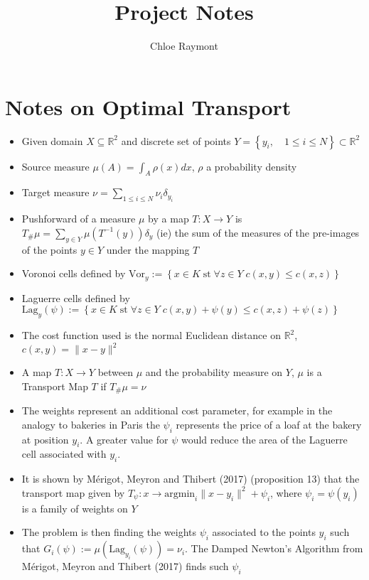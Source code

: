 \documentclass[]{article}
\title{Project Notes}
\author{Chloe Raymont}
\begin{document}
\maketitle

\begin{abstract}

\end{abstract}

\section{Notes on Optimal Transport}
	\begin{itemize}
		\item Given domain $X \subseteq \mathbb{R}^2$ and discrete set of points $Y = \left\lbrace y_i, \quad 1\leq i \leq N \right\rbrace  \subset \mathbb{R}^2$ 
		\item Source measure $\mu(A) = \int_A \rho(x)dx$, $\rho$ a probability density
		\item Target measure $\nu = \sum_{1\leq i \leq N}\nu_i \delta_{y_i}$ 
		\item Pushforward of a measure $\mu$ by a map $T: X \rightarrow Y$ is $T_{\#}\mu = \sum_{y \in Y} \mu \left( T^{-1}(y) \right) \delta_{y}$ (ie) the sum of the measures of the pre-images of the points $y \in Y$ under the mapping $T$
		\item Voronoi cells defined by $\text{Vor}_y := \left\lbrace x \in K \; \text{st} \; \forall z \in Y \; c(x,y) \leq c(x,z) \right\rbrace$
		\item Laguerre cells defined by $\text{Lag}_y(\psi) := \left\lbrace x \in K \; \text{st} \; \forall z \in Y \; c(x,y) + \psi(y) \leq c(x,z) + \psi(z) \right\rbrace$
		\item The cost function used is the normal Euclidean distance on $\mathbb{R}^2$, $c(x,y) = \| x-y\|^2$
		\item A map $T: X \rightarrow Y$ between $\mu$ and the probability measure on $Y$, $\mu$ is a Transport Map $T$ if $T_{\#}\mu = \nu$
		\item The weights represent an additional cost parameter, for example in the analogy to bakeries in Paris the $\psi_i$ represents the price of a loaf at the bakery at position $y_i$. A greater value for $\psi$ would reduce the area of the Laguerre cell associated with $y_i$.
		\item It is shown by M\'{e}rigot, Meyron and Thibert (2017) (proposition 13) that the transport map given by $T_\psi: x \rightarrow \text{argmin}_i\| x - y_i \|^2 + \psi_i$, where $\psi_i = \psi(y_i)$ is a family of weights on $Y$
		
		\item The problem is then finding the weights $\psi_i$ associated to the points $y_i$ such that $G_i(\psi) := \mu (\text{Lag}_{y_i}(\psi)) = \nu_i$. The Damped Newton's Algorithm from M\'{e}rigot, Meyron and Thibert (2017) finds such $\psi_i$
		
	\end{itemize}
\end{document}
